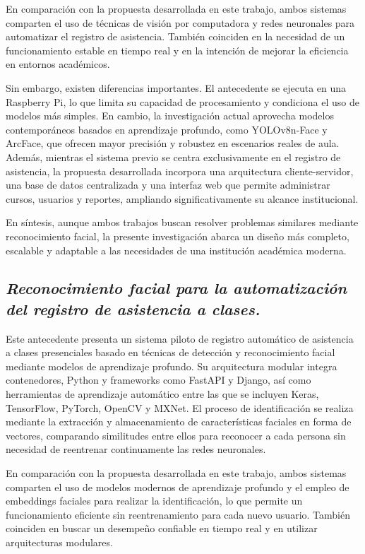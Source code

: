 En comparación con la propuesta desarrollada en este trabajo, ambos sistemas comparten el uso de técnicas de visión por computadora y redes neuronales para automatizar el registro de asistencia. También coinciden en la necesidad de un funcionamiento estable en tiempo real y en la intención de mejorar la eficiencia en entornos académicos.

Sin embargo, existen diferencias importantes. El antecedente se ejecuta en una Raspberry Pi, lo que limita su capacidad de procesamiento y condiciona el uso de modelos más simples. En cambio, la investigación actual aprovecha modelos contemporáneos basados en aprendizaje profundo, como YOLOv8n-Face y ArcFace, que ofrecen mayor precisión y robustez en escenarios reales de aula. Además, mientras el sistema previo se centra exclusivamente en el registro de asistencia, la propuesta desarrollada incorpora una arquitectura cliente-servidor, una base de datos centralizada y una interfaz web que permite administrar cursos, usuarios y reportes, ampliando significativamente su alcance institucional.

En síntesis, aunque ambos trabajos buscan resolver problemas similares mediante reconocimiento facial, la presente investigación abarca un diseño más completo, escalable y adaptable a las necesidades de una institución académica moderna.

\subsection*{\textit{Reconocimiento facial para la automatización del registro de asistencia a clases.}}

Este antecedente presenta un sistema piloto de registro automático de asistencia a clases presenciales basado en técnicas de detección y reconocimiento facial mediante modelos de aprendizaje profundo. Su arquitectura modular integra contenedores, Python y frameworks como FastAPI y Django, así como herramientas de aprendizaje automático entre las que se incluyen Keras, TensorFlow, PyTorch, OpenCV y MXNet. El proceso de identificación se realiza mediante la extracción y almacenamiento de características faciales en forma de vectores, comparando similitudes entre ellos para reconocer a cada persona sin necesidad de reentrenar continuamente las redes neuronales\cite{automatizacionAsistencia}.

En comparación con la propuesta desarrollada en este trabajo, ambos sistemas comparten el uso de modelos modernos de aprendizaje profundo y el empleo de embeddings faciales para realizar la identificación, lo que permite un funcionamiento eficiente sin reentrenamiento para cada nuevo usuario. También coinciden en buscar un desempeño confiable en tiempo real y en utilizar arquitecturas modulares.

